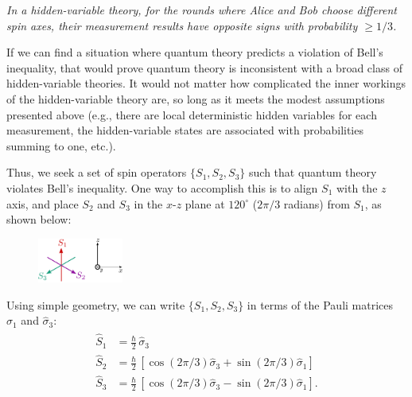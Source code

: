 \documentclass[pra,12pt]{revtex4-2}
\begin{document}
\begin{framed}
\noindent
\textit{In a hidden-variable theory, for the rounds where Alice and
  Bob choose different spin axes, their measurement results have
  opposite signs with probability $\ge 1/3$.}
\end{framed}

If we can find a situation where quantum theory predicts a violation
of Bell's inequality, that would prove quantum theory is inconsistent
with a broad class of hidden-variable theories.  It would not matter
how complicated the inner workings of the hidden-variable theory are,
so long as it meets the modest assumptions presented above (e.g.,
there are local deterministic hidden variables for each measurement,
the hidden-variable states are associated with probabilities summing
to one, etc.).

Thus, we seek a set of spin operators $\{S_1, S_2, S_3\}$ such that
quantum theory violates Bell's inequality.  One way to accomplish this
is to align $S_1$ with the $z$ axis, and place $S_2$ and $S_3$ in the
$x$-$z$ plane at $120^\circ$ ($2\pi/3$ radians) from $S_1$, as shown
below:

\begin{figure}[h]
  \centering\includegraphics[width=0.25\textwidth]{bellaxes}
\end{figure}

\noindent
Using simple geometry, we can write $\{S_1, S_2, S_3\}$ in terms of
the Pauli matrices $\hat{\sigma}_1$ and $\hat{\sigma}_3$:
\begin{align}
  \begin{aligned}\hat{S}_1 &= \frac{\hbar}{2} \, \hat{\sigma}_3
    \\ \hat{S}_2 &= \frac{\hbar}{2} \, \left[\cos(2\pi/3) \hat{\sigma}_3 + \sin(2\pi/3)\hat{\sigma}_1\right]  \\   \hat{S}_3 &= \frac{\hbar}{2} \, \left[\cos(2\pi/3) \hat{\sigma}_3 - \sin(2\pi/3)\hat{\sigma}_1\right].\end{aligned}
\end{align}
\end{document}
